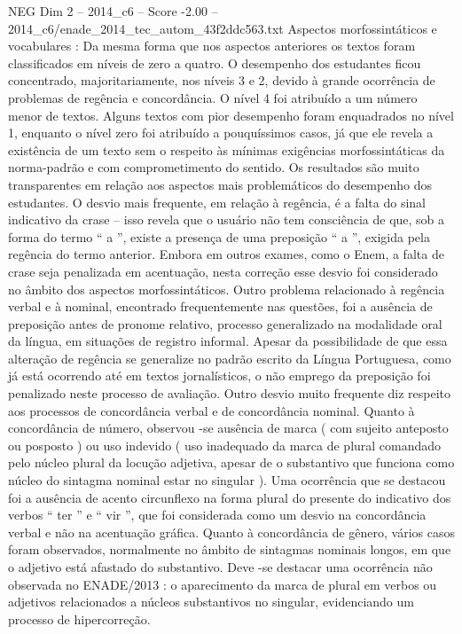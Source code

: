 \begin{textsample}{NEG Dim 2 – 2014\_c6 – Score -2.00 – 2014\_c6/enade\_2014\_tec\_autom\_43f2ddc563.txt}
Aspectos morfossintáticos e vocabulares : Da mesma forma que nos aspectos anteriores os textos foram classificados em níveis de zero a quatro.
O desempenho dos estudantes ficou concentrado, majoritariamente, nos níveis 3 e 2, devido à grande ocorrência de problemas de regência e concordância.
O nível 4 foi atribuído a um número menor de textos.
Alguns textos com pior desempenho foram enquadrados no nível 1, enquanto o nível zero foi atribuído a pouquíssimos casos, já que ele revela a existência de um texto sem o respeito às mínimas exigências morfossintáticas da norma-padrão e com comprometimento do sentido.
Os resultados são muito transparentes em relação aos aspectos mais problemáticos do desempenho dos estudantes.
O desvio mais frequente, em relação à regência, é a falta do sinal indicativo da crase – isso revela que o usuário não tem consciência de que, sob a forma do termo “ a ”, existe a presença de uma preposição “ a ”, exigida pela regência do termo anterior.
Embora em outros exames, como o Enem, a falta de crase seja penalizada em acentuação, nesta correção esse desvio foi considerado no âmbito dos aspectos morfossintáticos.
Outro problema relacionado à regência verbal e à nominal, encontrado frequentemente nas questões, foi a ausência de preposição antes de pronome relativo, processo generalizado na modalidade oral da língua, em situações de registro informal.
Apesar da possibilidade de que essa alteração de regência se generalize no padrão escrito da Língua Portuguesa, como já está ocorrendo até em textos jornalísticos, o não emprego da preposição foi penalizado neste processo de avaliação.
Outro desvio muito frequente diz respeito aos processos de concordância verbal e de concordância nominal.
Quanto à concordância de número, observou -se ausência de marca ( com sujeito anteposto ou posposto ) ou uso indevido ( uso inadequado da marca de plural comandado pelo núcleo plural da locução adjetiva, apesar de o substantivo que funciona como núcleo do sintagma nominal estar no singular ).
Uma ocorrência que se destacou foi a ausência de acento circunflexo na forma plural do presente do indicativo dos verbos “ ter ” e “ vir ”, que foi considerada como um desvio na concordância verbal e não na acentuação gráfica.
Quanto à concordância de gênero, vários casos foram observados, normalmente no âmbito de sintagmas nominais longos, em que o adjetivo está afastado do substantivo.
Deve -se destacar uma ocorrência não observada no ENADE/2013 : o aparecimento da marca de plural em verbos ou adjetivos relacionados a núcleos substantivos no singular, evidenciando um processo de hipercorreção.

\end{textsample}
